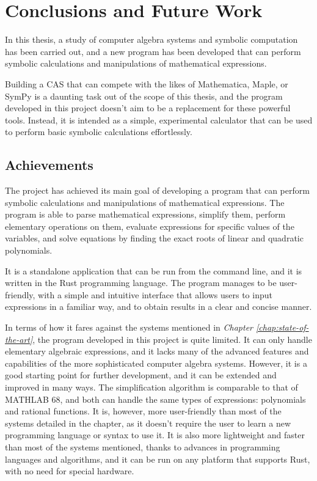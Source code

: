 \chapter{Conclusions and Future Work}\label{chap:conclusions}

In this thesis, a study of computer algebra systems and symbolic computation has been carried out, and a new program has been developed that can perform symbolic calculations and manipulations of mathematical expressions.

Building a CAS that can compete with the likes of Mathematica, Maple, or SymPy is a daunting task out of the scope of this thesis, and the program developed in this project doesn't aim to be a replacement for these powerful tools. Instead, it is intended as a simple, experimental calculator that can be used to perform basic symbolic calculations effortlessly.

\section{Achievements}\label{sec:results}

The project has achieved its main goal of developing a program that can perform symbolic calculations and manipulations of mathematical expressions. The program is able to parse mathematical expressions, simplify them, perform elementary operations on them, evaluate expressions for specific values of the variables, and solve equations by finding the exact roots of linear and quadratic polynomials.

It is a standalone application that can be run from the command line, and it is written in the Rust programming language. The program manages to be user-friendly, with a simple and intuitive interface that allows users to input expressions in a familiar way, and to obtain results in a clear and concise manner.

In terms of how it fares against the systems mentioned in \textit{Chapter \ref{chap:state-of-the-art}}, the program developed in this project is quite limited. It can only handle elementary algebraic expressions, and it lacks many of the advanced features and capabilities of the more sophisticated computer algebra systems. However, it is a good starting point for further development, and it can be extended and improved in many ways. The simplification algorithm is comparable to that of MATHLAB 68, and both can handle the same types of expressions: polynomials and rational functions. It is, however, more user-friendly than most of the systems detailed in the chapter, as it doesn't require the user to learn a new programming language or syntax to use it. It is also more lightweight and faster than most of the systems mentioned, thanks to advances in programming languages and algorithms, and it can be run on any platform that supports Rust, with no need for special hardware.

